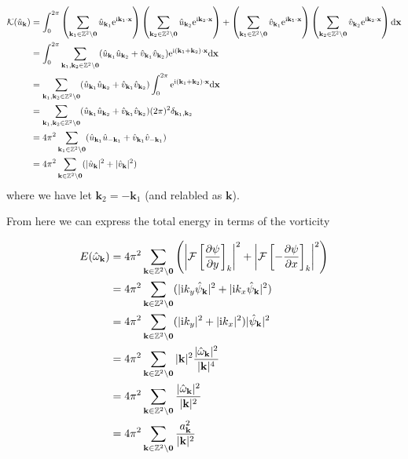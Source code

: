 \documentclass[9pt]{article}
\newcommand{\pder}[2]{\frac{\partial #1}{\partial #2}}               %
\newcommand{\ii}{\mathrm{i}}      								  %
\newcommand{\e}{\mathrm{e}}      								  %
\newcommand{\bfx}{\mathbf{x}}								%
\newcommand{\bfk}{\mathbf{k}}								%
\newcommand{\bfkn}[1]{\mathbf{k}_{#1}}								%
\begin{document}
\begin{align}
\mathcal{K}(\hat{u}_{\bfk})	&= \int_0^{2\pi} \left(\sum_{\mathbf{k}_1\in \mathbb{Z}^2\setminus \mathbf{0}}\hat{u}_{\mathbf{k}_1}\e^{\ii \mathbf{k}_1\cdot \mathbf{x}}\right)\left(\sum_{\mathbf{k}_2\in \mathbb{Z}^2\setminus \mathbf{0}}\hat{u}_{\mathbf{k}_2}\e^{\ii \mathbf{k}_2\cdot \mathbf{x}}\right) + \left(\sum_{\mathbf{k}_1\in \mathbb{Z}^2\setminus \mathbf{0}}\hat{v}_{\mathbf{k}_1}\e^{\ii \mathbf{k}_1\cdot \mathbf{x}}\right)\left(\sum_{\mathbf{k}_2\in \mathbb{Z}^2\setminus \mathbf{0}}\hat{v}_{\mathbf{k}_2}\e^{\ii \mathbf{k}_2\cdot \mathbf{x}}\right) \mathrm{d}\bfx \notag\\
	&= \int_0^{2\pi} \sum_{\mathbf{k}_1, \mathbf{k}_2\in \mathbb{Z}^2\setminus \mathbf{0}} (\hat{u}_{\mathbf{k}_1}\hat{u}_{\mathbf{k}_2} + \hat{v}_{\mathbf{k}_1}\hat{v}_{\mathbf{k}_2}) \e^{\ii (\mathbf{k}_1 + \mathbf{k}_2)\cdot \mathbf{x}} \mathrm{d}\bfx \notag \\
	&= \sum_{\mathbf{k}_1, \mathbf{k}_2\in \mathbb{Z}^2\setminus \mathbf{0}} (\hat{u}_{\mathbf{k}_1}\hat{u}_{\mathbf{k}_2} + \hat{v}_{\mathbf{k}_1}\hat{v}_{\mathbf{k}_2}) \int_0^{2\pi} \e^{\ii (\mathbf{k}_1 + \mathbf{k}_2)\cdot \mathbf{x}} \mathrm{d}\bfx \notag \\
	&= \sum_{\mathbf{k}_1, \mathbf{k}_2\in \mathbb{Z}^2\setminus \mathbf{0}} (\hat{u}_{\mathbf{k}_1}\hat{u}_{\mathbf{k}_2} + \hat{v}_{\mathbf{k}_1}\hat{v}_{\mathbf{k}_2}) (2\pi)^2 \delta_{\bfkn{1}, \bfkn{2}} \notag \\
	&= 4\pi^2 \sum_{\mathbf{k}_1\in \mathbb{Z}^2\setminus \mathbf{0}} (\hat{u}_{\mathbf{k}_1}\hat{u}_{-\mathbf{k}_1} + \hat{v}_{\mathbf{k}_1}\hat{v}_{-\mathbf{k}_{1}}) \notag \\
	&= 4\pi^2 \sum_{\mathbf{k}\in \mathbb{Z}^2\setminus \mathbf{0}} (|\hat{u}_{\mathbf{k}}|^2 + |\hat{v}_{\mathbf{k}}|^2)
	\label{eq:energy_u_fourier}
\end{align}
where we have let $\bfkn{2} = - \bfkn{1}$ (and relabled as $\bfk$).

From here we can express the total energy in terms of the vorticity 

\begin{align}
E(\hat{\omega}_{\bfk}) &=  4\pi^2 \sum_{\mathbf{k}\in \mathbb{Z}^2\setminus \mathbf{0}} \left(\left|\mathcal{F}\left[\pder{\psi}{y}\right]_k\right|^2 + \left|\mathcal{F}\left[-\pder{\psi}{x}\right]_k\right|^2 \right) \notag \\
&= 4\pi^2 \sum_{\mathbf{k}\in \mathbb{Z}^2\setminus \mathbf{0}} (|\ii k_{y}\hat{\psi}_{\mathbf{k}}|^2 + |\ii k_x \hat{\psi}_{\mathbf{k}}|^2) \notag \\
&= 4\pi^2 \sum_{\mathbf{k}\in \mathbb{Z}^2\setminus \mathbf{0}} (|\ii k_{y}|^2 + |\ii k_x|^2)|\hat{\psi}_{\mathbf{k}}|^2 \notag \\
&= 4\pi^2 \sum_{\mathbf{k}\in \mathbb{Z}^2\setminus \mathbf{0}} |\bfk|^2\frac{|\hat{\omega}_{\mathbf{k}}|^2}{|\bfk|^4} \notag \\
&= 4\pi^2 \sum_{\mathbf{k}\in \mathbb{Z}^2\setminus \mathbf{0}} \frac{|\hat{\omega}_{\mathbf{k}}|^2}{|\bfk|^2} \notag \\
&= 4\pi^2 \sum_{\mathbf{k}\in \mathbb{Z}^2\setminus \mathbf{0}} \frac{a_{\mathbf{k}}^2}{|\bfk|^2}
\label{eq:energy_w_fourier}
\end{align}
\end{document}
